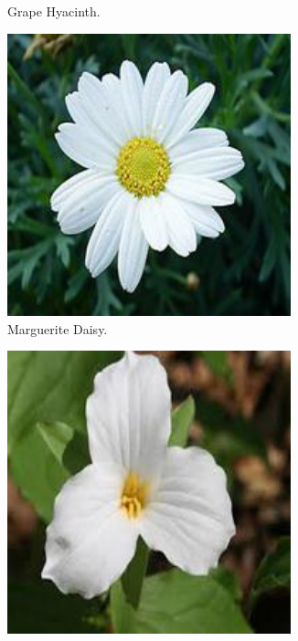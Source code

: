 \begin{figure}
\begin{subfigure}{0.24\textwidth}
        \caption{Grape Hyacinth.}
    \end{subfigure}
    \vspace{0.07cm}
    \begin{subfigure}{0.24\textwidth}
        \centering
        \includegraphics[width=0.9\textwidth]{../example_images/MargueriteDaisy.jpg}
        \caption{Marguerite Daisy.}
    \end{subfigure}
    \begin{subfigure}{0.24\textwidth}
        \centering
        \includegraphics[width=0.9\textwidth]{../example_images/Trillium.jpg}

\end{subfigure}
\end{figure}
